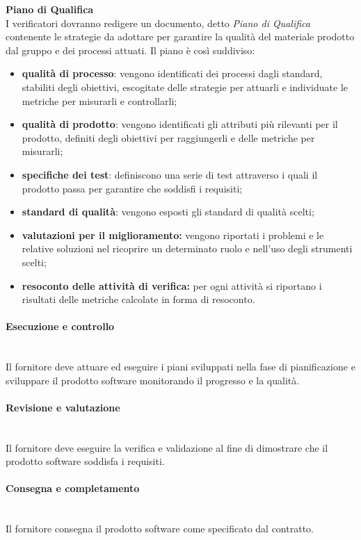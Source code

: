 			\noindent\textbf{Piano di Qualifica} \mbox{}\\
			
			\noindent I verificatori dovranno redigere un documento, detto \textit{Piano di 
				Qualifica} contenente le strategie da adottare per garantire la qualità del 
			materiale prodotto dal gruppo e dei processi attuati. Il piano è così 
			suddiviso:
			\begin{itemize}
				\item \textbf{qualità di processo}: vengono identificati dei processi dagli 
				standard, stabiliti degli obiettivi, escogitate delle strategie per 
				attuarli e 			
				individuate le metriche per misurarli e controllarli;
				\item \textbf{qualità di prodotto}: vengono identificati gli attributi più 
				rilevanti per il prodotto, definiti degli obiettivi per raggiungerli e 
				delle 
				metriche per misurarli;
				\item \textbf{specifiche dei test}: definiscono una serie di test 
				attraverso 
				i quali il prodotto passa per garantire che soddisfi i requisiti;
				\item \textbf{standard di qualità}: vengono esposti gli standard di qualità 
				scelti;
				\item \textbf{valutazioni per il miglioramento:} vengono riportati i 
				problemi 
				e le relative soluzioni nel ricoprire un determinato ruolo e nell'uso degli 
				strumenti scelti;
				\item \textbf{resoconto delle attività di verifica:} per ogni attività si 
				riportano i risultati delle metriche calcolate in forma di resoconto.
			\end{itemize}

		\paragraph{Esecuzione e controllo} \mbox{}\\
		Il fornitore deve attuare ed eseguire i piani sviluppati nella fase di 
		pianificazione e sviluppare il prodotto software monitorando il progresso e la 
		qualità.
		\paragraph{Revisione e valutazione} \mbox{}\\
		Il fornitore deve eseguire la verifica e validazione al fine di dimostrare che 
		il prodotto software soddisfa i requisiti.
		\paragraph{Consegna e completamento} \mbox{}\\
		Il fornitore consegna il prodotto software come specificato dal contratto.	

